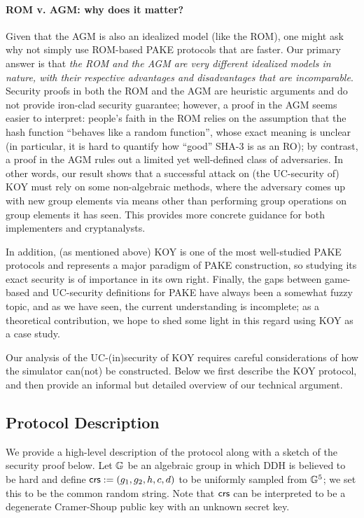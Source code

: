 \paragraph{ROM v. AGM: why does it matter?}
Given that the AGM is also an idealized model (like the ROM), one might ask why not simply use ROM-based PAKE protocols that are faster. Our primary answer is that \emph{the ROM and the AGM are very different idealized models in nature, with their respective advantages and disadvantages that are incomparable}. Security proofs in both the ROM and the AGM are heuristic arguments and do not provide iron-clad security guarantee; however, a proof in the AGM seems easier to interpret: people's faith in the ROM relies on the assumption that the hash function ``behaves like a random function'', whose exact meaning is unclear (in particular, it is hard to quantify how ``good'' SHA-3 is as an RO); by contrast, a proof in the AGM rules out a limited yet well-defined class of adversaries. In other words, our result shows that a successful attack on (the UC-security of) KOY must rely on some non-algebraic methods, where the adversary comes up with new group elements via means other than performing group operations on group elements it has seen. This provides more concrete guidance for both implementers and cryptanalysts.

In addition, (as mentioned above) KOY is one of the most well-studied PAKE protocols and represents a major paradigm of PAKE construction, so studying its exact security is of importance in its own right. Finally, the gaps between game-based and UC-security definitions for PAKE have always been a somewhat fuzzy topic, and as we have seen, the current understanding is incomplete; as a theoretical contribution, we hope to shed some light in this regard using KOY as a case study.

Our analysis of the UC-(in)security of KOY requires careful considerations of how the simulator can(not) be constructed. Below we first describe the KOY protocol, and then provide an informal but detailed overview of our technical argument.

\subsection{Protocol Description}
 

We provide a high-level description of the protocol along with a sketch of the security proof below. Let $\mathbb{G}$ be an algebraic group in which DDH is believed to be hard and define $\mathsf{crs} := (g_1, g_2, h, c, d)$ to be uniformly sampled from $\mathbb{G}^5$; we set this to be the common random string. Note that $\mathsf{crs}$ can be interpreted to be a degenerate Cramer-Shoup public key with an unknown secret key.

